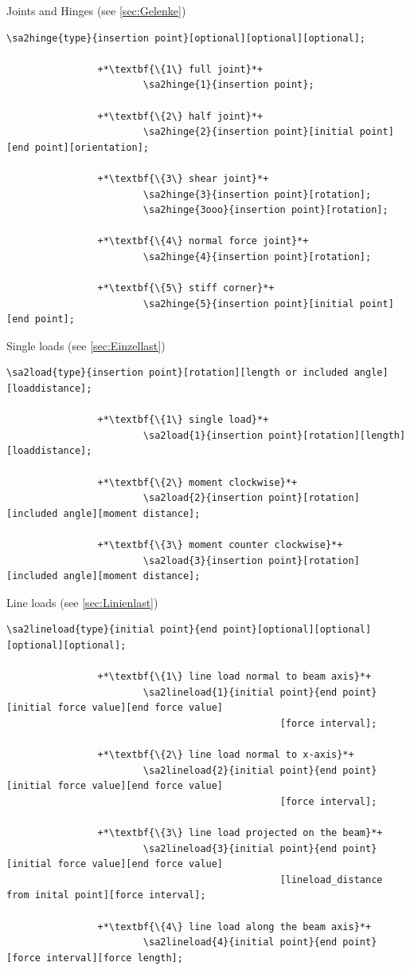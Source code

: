 \documentclass[%
  a4paper,
  BCOR=20mm,
  numbers=noenddot,
  twoside,
  parskip=half,
  openright,
  version=last,
]{scrreprt}
\begin{document}
Joints and Hinges (see \ref{sec:Gelenke})

\begin{lstlisting}[emph={hinge},backgroundcolor=\color{white}]
		\sa2hinge{type}{insertion point}[optional][optional][optional];
		
				+*\textbf{\{1\} full joint}*+
						\sa2hinge{1}{insertion point};
						
				+*\textbf{\{2\} half joint}*+
						\sa2hinge{2}{insertion point}[initial point][end point][orientation];
						
				+*\textbf{\{3\} shear joint}*+
						\sa2hinge{3}{insertion point}[rotation];
						\sa2hinge{3ooo}{insertion point}[rotation];
						
				+*\textbf{\{4\} normal force joint}*+
						\sa2hinge{4}{insertion point}[rotation];		

				+*\textbf{\{5\} stiff corner}*+
						\sa2hinge{5}{insertion point}[initial point][end point];								
\end{lstlisting}\vspace{-10mm}

Single loads (see \ref{sec:Einzellast})

\begin{lstlisting}[emph={load},backgroundcolor=\color{white}]
		\sa2load{type}{insertion point}[rotation][length or included angle][loaddistance];
		
				+*\textbf{\{1\} single load}*+
						\sa2load{1}{insertion point}[rotation][length][loaddistance];
						
				+*\textbf{\{2\} moment clockwise}*+
						\sa2load{2}{insertion point}[rotation][included angle][moment distance];
						
				+*\textbf{\{3\} moment counter clockwise}*+
						\sa2load{3}{insertion point}[rotation][included angle][moment distance];				
\end{lstlisting}\vspace{-10mm}

Line loads (see \ref{sec:Linienlast})

\begin{lstlisting}[emph={lineload},backgroundcolor=\color{white}]
		\sa2lineload{type}{initial point}{end point}[optional][optional][optional][optional];
		
				+*\textbf{\{1\} line load normal to beam axis}*+
						\sa2lineload{1}{initial point}{end point}[initial force value][end force value]
												[force interval];
						
				+*\textbf{\{2\} line load normal to x-axis}*+
						\sa2lineload{2}{initial point}{end point}[initial force value][end force value]
												[force interval];
						
				+*\textbf{\{3\} line load projected on the beam}*+
						\sa2lineload{3}{initial point}{end point}[initial force value][end force value]
												[lineload_distance from inital point][force interval];	
						
				+*\textbf{\{4\} line load along the beam axis}*+
						\sa2lineload{4}{initial point}{end point}[force interval][force length];				
\end{lstlisting}\vspace{-10mm}
\end{document}
